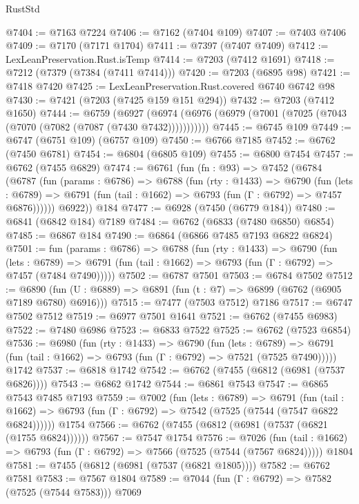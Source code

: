 \begin{lexlean}{RustStd}
\begin{coremodule}
{\begin{coremodule}
{{{{{{{{{{{{{{{{{{{{{{{{{{{{{{{{{{{{{{{{{{{{@7404 := @7163 @7224
@7406 := @7162 (@7404 @109)
@7407 := @7403 @7406
@7409 := @7170 (@7171 @1704)
@7411 := @7397 (@7407 @7409)
@7412 := LexLeanPreservation.Rust.isTemp
@7414 := @7203 (@7412 @1691)
@7418 := @7212 (@7379 (@7384 (@7411 @7414)))
@7420 := @7203 (@6895 @98)
@7421 := @7418 @7420
@7425 := LexLeanPreservation.Rust.covered @6740 @6742 @98
@7430 := @7421 (@7203 (@7425 @159 @151 @294))
@7432 := @7203 (@7412 @1650)
@7444 := @6759
    (@6927 (@6974 (@6976 (@6979 (@7001 (@7025 (@7043 (@7070 (@7082 (@7087 (@7430 @7432)))))))))))
@7445 := @6745 @109
@7449 := @6747 (@6751 @109) (@6757 @109)
@7450 := @6766 @7185
@7452 := @6762 (@7450 @6781)
@7454 := @6804 (@6805 @109)
@7455 := @6800 @7454
@7457 := @6762 (@7455 @6829)
@7474 := @6761
    (fun (fn : @93) =>
    @7452
      (@6784
        (@6787
          (fun (params : @6786) =>
          @6788
            (fun (rty : @1433) =>
            @6790
              (fun (lets : @6789) =>
              @6791 (fun (tail : @1662) => @6793 (fun (Γ : @6792) => @7457 @6876))))))
        @6922))
    @184
@7477 := @6928 (@7450 (@6779 @184))
@7480 := @6841 (@6842 @184) @7189
@7484 := @6762 (@6833 (@7480 @6850) @6854)
@7485 := @6867 @184
@7490 := @6864 (@6866 @7485 @7193 @6822 @6824)
@7501 := fun (params : @6786) =>
  @6788
    (fun (rty : @1433) =>
    @6790
      (fun (lets : @6789) =>
      @6791 (fun (tail : @1662) => @6793 (fun (Γ : @6792) => @7457 (@7484 @7490)))))
@7502 := @6787 @7501
@7503 := @6784 @7502
@7512 := @6890 (fun (U : @6889) => @6891 (fun (t : @7) => @6899 (@6762 (@6905 @7189 @6780) @6916)))
@7515 := @7477 (@7503 @7512) @7186
@7517 := @6747 @7502 @7512
@7519 := @6977 @7501 @1641
@7521 := @6762 (@7455 @6983)
@7522 := @7480 @6986
@7523 := @6833 @7522
@7525 := @6762 (@7523 @6854)
@7536 := @6980
    (fun (rty : @1433) =>
    @6790
      (fun (lets : @6789) =>
      @6791 (fun (tail : @1662) => @6793 (fun (Γ : @6792) => @7521 (@7525 @7490)))))
    @1742
@7537 := @6818 @1742
@7542 := @6762 (@7455 (@6812 (@6981 (@7537 @6826))))
@7543 := @6862 @1742
@7544 := @6861 @7543
@7547 := @6865 @7543 @7485 @7193
@7559 := @7002
    (fun (lets : @6789) =>
    @6791
      (fun (tail : @1662) => @6793 (fun (Γ : @6792) => @7542 (@7525 (@7544 (@7547 @6822 @6824))))))
    @1754
@7566 := @6762 (@7455 (@6812 (@6981 (@7537 (@6821 (@1755 @6824))))))
@7567 := @7547 @1754
@7576 := @7026
    (fun (tail : @1662) => @6793 (fun (Γ : @6792) => @7566 (@7525 (@7544 (@7567 @6824)))))
    @1804
@7581 := @7455 (@6812 (@6981 (@7537 (@6821 @1805))))
@7582 := @6762 @7581
@7583 := @7567 @1804
@7589 := @7044 (fun (Γ : @6792) => @7582 (@7525 (@7544 @7583))) @7069
}}}}}}}}}}}}}}}}}}}}}}}}}}}}}}}}}}}}}}}}}}}}
\end{coremodule}}
\end{coremodule}
\end{lexlean}

